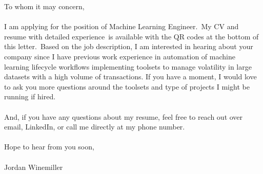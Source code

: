 
\large{
    To whom it may concern,\\
    \\
    I am applying for the position of Machine Learning Engineer.\ My CV and
    resume with detailed experience\ is available with the QR codes at the
    bottom of this letter.\ Based on the job description, I am interested in
    hearing about your company since I have previous work experience in
    automation of machine learning lifecycle workflows implementing toolsets
    to manage volatility in large datasets with a high volume of transactions.
    If you have a moment, I would love to ask you more questions around the
    toolsets and type of projects I might be running if hired.\\
    \\
    And, if you have any questions about my resume, feel free to reach out over
    email, LinkedIn, or call me directly at my phone number.\\
    \\
    Hope to hear from you soon,\\
    \\
    Jordan Winemiller
}